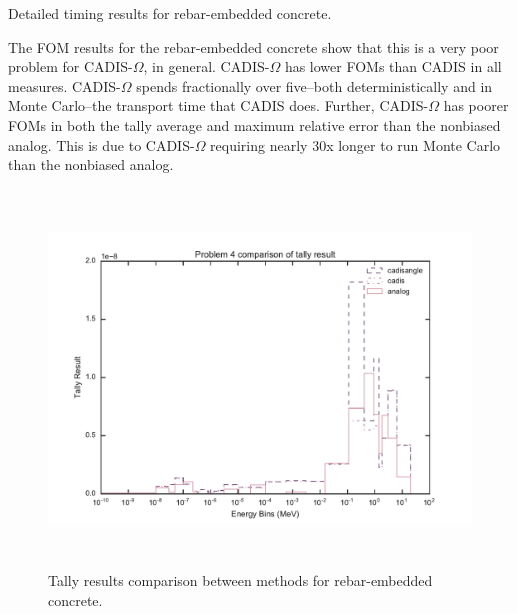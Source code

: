 \begin{table}[h!]
  \centering
  
  \caption[Detailed timing results for rebar-embedded concrete]
  {Detailed timing results for rebar-embedded concrete.}
  \label{tab:rebartimes}
\end{table}

The FOM results for the rebar-embedded concrete show that this is a very poor
problem for CADIS-$\Omega$, in general. CADIS-$\Omega$ has lower FOMs than CADIS
in all measures. CADIS-$\Omega$ spends fractionally over five--both
deterministically and in Monte Carlo--the
transport time that CADIS does. Further, CADIS-$\Omega$ has poorer FOMs in both
the tally average and maximum relative error than the nonbiased analog. This is
due to CADIS-$\Omega$ requiring nearly 30x longer to run Monte Carlo than the
nonbiased analog.

\begin{figure}[h!]
  \centering
  \includegraphics[height=10cm]{./chapters/characterization_probs/figures/char/prob_4/problem_4_tally_result_compare.pdf}
  \caption[Tally results comparison between methods for rebar-embedded concrete.]
  {Tally results comparison between methods for rebar-embedded concrete.}
  \label{fig:rebarresult}
\end{figure}


